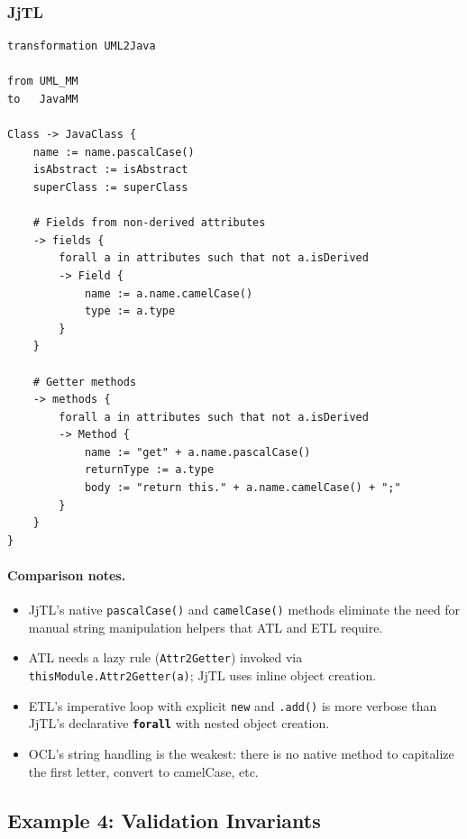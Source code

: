 \documentclass[11pt,a4paper]{article}
\newcommand{\jjtl}{\textsf{JjTL}}
\newcommand{\kw}[1]{\texttt{\textbf{#1}}}
\begin{document}
\subsubsection{JjTL}

\begin{lstlisting}[style=jjtl,caption={UML2Java structural mapping in JjTL}]
transformation UML2Java

from UML_MM
to   JavaMM

Class -> JavaClass {
    name := name.pascalCase()
    isAbstract := isAbstract
    superClass := superClass

    # Fields from non-derived attributes
    -> fields {
        forall a in attributes such that not a.isDerived
        -> Field {
            name := a.name.camelCase()
            type := a.type
        }
    }

    # Getter methods
    -> methods {
        forall a in attributes such that not a.isDerived
        -> Method {
            name := "get" + a.name.pascalCase()
            returnType := a.type
            body := "return this." + a.name.camelCase() + ";"
        }
    }
}
\end{lstlisting}

\paragraph{Comparison notes.}
\begin{itemize}
    \item \jjtl{}'s native \texttt{pascalCase()} and \texttt{camelCase()} methods eliminate the need for manual string manipulation helpers that ATL and ETL require.
    \item ATL needs a lazy rule (\texttt{Attr2Getter}) invoked via \texttt{thisModule.Attr2Getter(a)}; \jjtl{} uses inline object creation.
    \item ETL's imperative loop with explicit \texttt{new} and \texttt{.add()} is more verbose than \jjtl{}'s declarative \kw{forall} with nested object creation.
    \item OCL's string handling is the weakest: there is no native method to capitalize the first letter, convert to camelCase, etc.
\end{itemize}


\subsection{Example 4: Validation Invariants}
\end{document}
